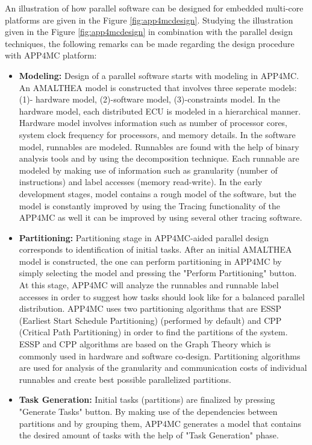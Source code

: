 An illustration of how parallel software can be designed for embedded multi-core platforms are given in the Figure \ref{fig:app4mcdesign}. Studying the illustration given in the Figure \ref{fig:app4mcdesign} in combination with the parallel design techniques, the following remarks can be made regarding the design procedure with APP4MC platform:
\begin{itemize}
	\item \textbf{Modeling:} Design of a parallel software starts with modeling in APP4MC. An AMALTHEA model is constructed that involves three seperate models: (1)- hardware model, (2)-software model, (3)-constraints model. In the hardware model, each distributed ECU is modeled in a hierarchical  manner. Hardware model involves information such as number of processor cores, system clock frequency for processors, and memory details. In the software model, runnables are modeled. Runnables are found with the help of binary analysis tools and by using the decomposition technique. Each runnable are modeled by making use of information such as granularity (number of instructions) and label accesses (memory read-write). In the early development stages, model contains a rough model of the software, but the model is constantly improved by using the Tracing functionality of the APP4MC as well it can be improved by using several other tracing software.
	\item \textbf{Partitioning:} Partitioning stage in APP4MC-aided parallel design corresponds to identification of initial tasks. After an initial AMALTHEA model is constructed, the one can perform partitioning in APP4MC by simply selecting the model and pressing the "Perform Partitioning" button. At this stage, APP4MC will analyze the runnables and runnable label accesses in order to suggest how tasks should look like for a balanced parallel distribution. APP4MC uses two partitioning algorithms that are ESSP (Earliest Start Schedule Partitioning) (performed by default) and CPP (Critical Path Partitioning) in order to find the partitions of the system. ESSP and CPP algorithms are based on the Graph Theory \cite{graphtheory} which is commonly used in hardware and software co-design. Partitioning algorithms are used for analysis of the granularity and communication costs of individual runnables and create best possible parallelized partitions.
	\item \textbf{Task Generation:} Initial tasks (partitions) are finalized by pressing "Generate Tasks" button. By making use of the dependencies between partitions and by grouping them, APP4MC generates a model that contains the desired amount of tasks with the help of "Task Generation" phase. 

\end{itemize}
